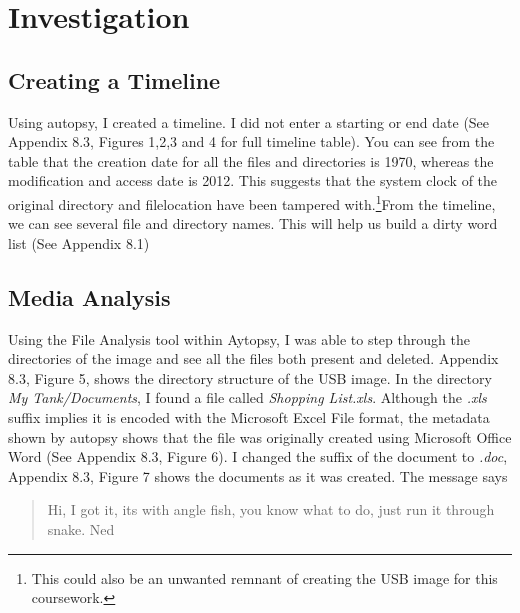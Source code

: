 \documentclass[12pt]{article}
\begin{document}
		\section{Investigation}

			\subsection{Creating a Timeline}
				
				Using autopsy, I created a timeline. I did not enter a starting or end date (See Appendix 8.3, Figures 1,2,3 and 4 for full timeline table). You can see from the table that the creation date for all the files and directories is 1970, whereas the modification and access date is 2012. This suggests that the system clock of the original  directory and filelocation have been tampered with.\footnote{This could also be an unwanted remnant of creating the USB image for this coursework.}\newline\newline From the timeline, we can see several file and directory names. This will help us build a dirty word list (See Appendix 8.1)   

			\subsection{Media Analysis}

				Using the File Analysis tool within Aytopsy, I was able to step through the directories of the image and see all the files both present and deleted. Appendix 8.3, Figure 5, shows the directory structure of the USB image. \newline\newline In the directory \textit{My Tank/Documents}, I found a file called \textit{Shopping List.xls}. Although the \textit{.xls} suffix implies it is encoded with the Microsoft Excel File format, the metadata shown by autopsy shows that the file was originally created using Microsoft Office Word (See Appendix 8.3, Figure 6). I changed the suffix of the document to \textit{.doc}, Appendix 8.3, Figure 7 shows the documents as it was created. The message says 
				
				\begin{quotation}
					\noindent Hi, \newline I got it, its with angle fish, you know what to do, just run it through snake. \newline Ned 
				\end{quotation}
\end{document}
